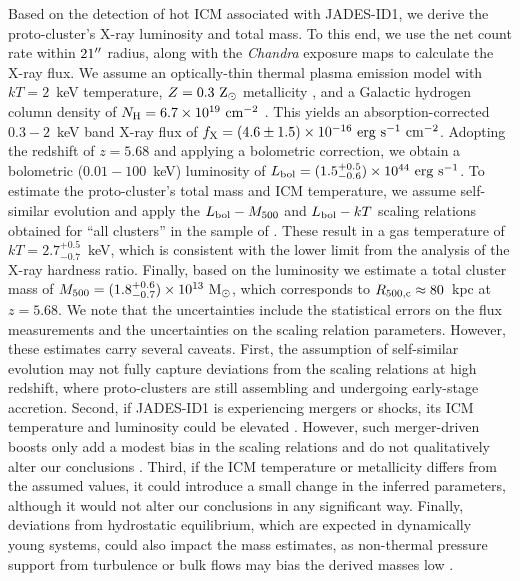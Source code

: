 \documentclass[pdflatex,sn-mathphys-num]{sn-jnl}
\newcommand{\arcsec}{\mbox{\ensuremath{^{\prime\prime}}}}
\theoremstyle{thmstyleone}
\theoremstyle{thmstyletwo}
\theoremstyle{thmstylethree}
\begin{document}
Based on the detection of hot ICM associated with JADES-ID1, we derive the proto-cluster's X-ray luminosity and total mass. To this end, we use the net count rate within $21\arcsec$ radius, along with the \textit{Chandra} exposure maps to calculate the X-ray flux. We assume an optically-thin thermal plasma emission model with $kT=2$~keV temperature, $Z=0.3\ \rm{Z_{\odot}}$ metallicity \cite{2016ApJ...826..124M,2024MNRAS.527.1033B}, and a Galactic hydrogen column density of $N_{\rm H} = 6.7\times10^{19} \ \rm{cm^{-2}}$ \cite{2016A&A...594A.116H}. This yields an absorption-corrected $0.3-2$~keV band X-ray flux of $f_{\rm X}	= (4.6\pm{1.5}) \times10^{-16} \ \rm{erg \ s^{-1} \ cm^{-2}}$. Adopting the redshift of $z=5.68$ and applying a bolometric correction, we obtain a bolometric ($0.01-100$~keV) luminosity of $L_{\rm bol} = (1.5^{+0.5}_{-0.6}) \times10^{44} \ \rm{erg \ s^{-1}}$. To estimate the proto-cluster's total mass and ICM temperature, we assume self-similar evolution and apply the $L_{\rm bol} - M_{\rm 500}$ and $L_{\rm bol} - kT$ scaling relations obtained for ``all clusters'' in the sample of \cite{2020ApJ...892..102L}. These result in a gas temperature of $kT	= 2.7^{+0.5}_{-0.7}$~keV, which is consistent with the lower limit from the analysis of the X-ray hardness ratio. Finally, based on the luminosity we estimate a total cluster mass of $M_{500}= (1.8^{+0.6}_{-0.7}) \times 10^{13} \ \rm{M_{\odot}}$, which corresponds to $R_{\rm 500,c}\approx80$~kpc at $z=5.68$. We note that the uncertainties include the statistical errors on the flux measurements and the uncertainties on the scaling relation parameters. However, these estimates carry several caveats. First, the assumption of self-similar evolution may not fully capture deviations from the scaling relations at high redshift, where proto-clusters are still assembling and undergoing early-stage accretion. Second, if JADES-ID1 is experiencing mergers or shocks, its ICM temperature and  luminosity could be elevated \cite{2001ApJ...561..621R,2002MNRAS.329..675R,2007PhR...443....1M,2013MNRAS.429.2617O,2022ApJ...925...91S,2024arXiv240703142C}. However, such merger-driven boosts only add a modest bias in the scaling relations and do not qualitatively alter our conclusions \cite{2002MNRAS.329..675R,2006ApJ...639...64O,2011ApJ...729...45R}. Third, if the ICM temperature or metallicity differs from the assumed values, it could introduce a small change in the inferred parameters, although it would not alter our conclusions in any significant way. Finally, deviations from hydrostatic equilibrium, which are expected in dynamically young systems, could also impact the mass estimates, as non-thermal pressure support from turbulence or bulk flows may bias the derived masses low \cite{2012ApJ...758...74B,2016MNRAS.455.2936S}.
\end{document}
